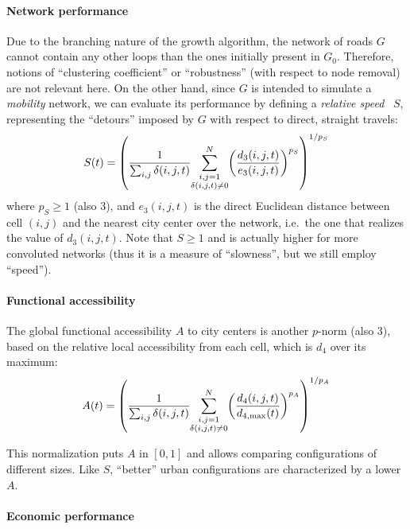 \paragraph{Network performance}

Due to the branching nature of the growth algorithm, the network of roads $G$ cannot contain any other loops than the ones initially present in $G_0$. Therefore, notions of ``clustering coefficient'' or ``robustness'' (with respect to node removal) are not relevant here. On the other hand, since $G$ is intended to simulate a \emph{mobility} network, we can evaluate its performance by defining a \emph{relative speed}~\cite{banos2012towards} $S$, representing the ``detours'' imposed by $G$ with respect to direct, straight travels:
%
\begin{equation}
S(t)=\left(\frac{1}{\sum_{i,j}\delta(i,j,t)}\!\!\sum_{\scriptstyle i,j=1\atop\scriptstyle\delta(i,j,t)\neq0}^N\!\!\left(\frac{d_3(i,j,t)}{e_3(i,j,t)}\right)^{p_S}\right)^{1/p_S}
\end{equation}
%
\noindent where $p_S\geq 1$ (also 3), and $e_3(i,j,t)$ is the direct Euclidean distance between cell $(i,j)$ and the nearest city center over the network, i.e.~the one that realizes the value of $d_3(i,j,t)$. Note that $S\ge1$ and is actually higher for more convoluted networks (thus it is a measure of ``slowness'', but we still employ ``speed'').

\paragraph{Functional accessibility}

The global functional accessibility $A$ to city centers is another $p$-norm (also 3), based on the relative local accessibility from each cell, which is $d_4$ over its maximum:
%
\begin{equation}
A(t)=\left(\frac{1}{\sum_{i,j}\delta(i,j,t)}\!\!\sum_{\scriptstyle i,j=1\atop\scriptstyle\delta(i,j,t)\neq0}^N\!\!\left(\frac{d_4(i,j,t)}{d_{4,\max}(t)}\right)^{p_A}\right)^{1/p_A}
\end{equation}

\noindent This normalization puts $A$ in $[0,1]$ and allows comparing configurations of different sizes. Like $S$, ``better'' urban configurations are characterized by a lower $A$.

\paragraph{Economic performance}

